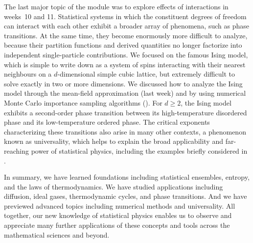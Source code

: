 The last major topic of the module was to explore effects of interactions in weeks~10 and 11.
Statistical systems in which the constituent degrees of freedom can interact with each other exhibit a broader array of phenomena, such as phase transitions.
At the same time, they become enormously more difficult to analyze, because their partition functions and derived quantities no longer factorize into independent single-particle contributions.
We focused on the famous Ising model, which is simple to write down as a system of spins interacting with their nearest neighbours on a $d$-dimensional simple cubic lattice, but extremely difficult to solve exactly in two or more dimensions.
We discussed how to analyze the Ising model through the mean-field approximation (last week) and by using numerical Monte Carlo importance sampling algorithms ().
For $d \geq 2$, the Ising model exhibits a second-order phase transition between its high-temperature disordered phase and its low-temperature ordered phase.
The critical exponents characterizing these transitions also arise in many other contexts, a phenomenon known as universality, which helps to explain the broad applicability and far-reaching power of statistical physics, including the examples briefly considered in .

In summary, we have learned foundations including statistical ensembles, entropy, and the laws of thermodynamics.
We have studied applications including diffusion, ideal gases, thermodynamic cycles, and phase transitions.
And we have previewed advanced topics including numerical methods and universality.
All together, our new knowledge of statistical physics enables us to observe and appreciate many further applications of these concepts and tools across the mathematical sciences and beyond.
